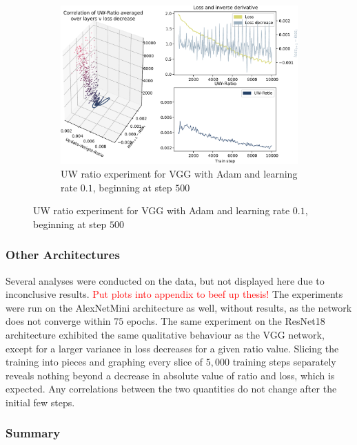 \begin{figure}
    \begin{subfigure}{\textwidth}
        \centering
        \includegraphics[width=\linewidth]{gfx/diagrams/experiments/ratio_loss_correlation/vgg_adam_01_500_10000.pdf}
        \caption{UW ratio experiment for VGG with Adam and learning rate $0.1$,
        beginning at step $500$}
        \label{fig:ratio_loss_corr_vgg_adam_01_500}
    \end{subfigure}
\end{figure}

\subsubsection{Other Architectures}

Several analyses were conducted on the data, but not displayed here due to
inconclusive results. \textcolor{red}{Put plots into appendix to beef up thesis!}
The experiments were run on the AlexNetMini architecture as well, without
results, as the network does not converge within $75$ epochs.
The same experiment on the ResNet18 architecture exhibited the same qualitative
behaviour as the VGG network, except for a larger variance in loss decreases for
a given ratio value. Slicing the training into pieces and graphing every slice
of $5,000$ training steps separately reveals nothing beyond a decrease in
absolute value of ratio and loss, which is expected. Any correlations between
the two quantities do not change after the initial few steps.

\subsubsection{Summary}

